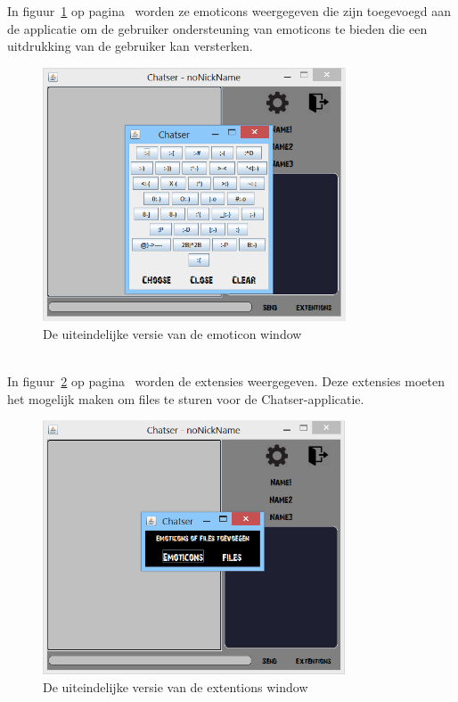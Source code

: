 \documentclass[12pt]{article}
\begin{document}
\noindent In figuur~\ref{figure013} op pagina~\pageref{figure013} worden ze emoticons weergegeven die zijn toegevoegd aan de applicatie om de gebruiker ondersteuning van emoticons te bieden die een uitdrukking van de gebruiker kan versterken.
\begin{figure}[ht]
\begin{center}
\includegraphics[width = 90mm]{chatser_emoticons}
\caption{De uiteindelijke versie van de emoticon window}
\label{figure013}
\end{center}
\end{figure}
\\

\noindent In figuur~\ref{figure014} op pagina~\pageref{figure014} worden de extensies weergegeven. Deze extensies moeten het mogelijk maken om files te sturen voor de Chatser-applicatie\small\textcopyright.
\begin{figure}[!h]
\begin{center}
\includegraphics[width = 90mm]{chatser_extentions}
\caption{De uiteindelijke versie van de extentions window}
\label{figure014}
\end{center}
\end{figure}
\\
\end{document}
